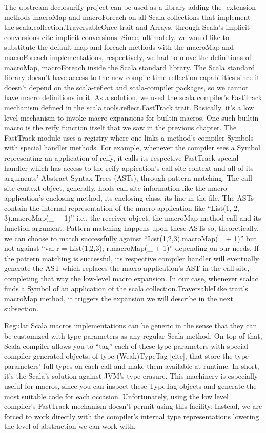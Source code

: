 The upstream declosurify project can be used as a library adding the -extension-
methods macroMap and macroForeach on all Scala collections that implement the
scala.collection.TraversableOnce trait and Arrays, through Scala's implicit
conversions {cite implicit conversions}. Since, ultimately, we would like to
substitute the default map and foreach methods with the macroMap and
macroForeach implementations, respectively, we had to move the definitions
of macroMap, macroForeach inside the Scala standard library. The Scala standard
library doesn't have access to the new compile-time reflection capabilities
since it doesn't depend on the scala-reflect and scala-compiler packages, so we
cannot have macro definitions in it. As a solution, we used the scala compiler's
FastTrack mechanism defined in the scala.tools.reflect.FastTrack trait.
Basically, it's a low level mechanism to invoke macro expansions for builtin
macros. One such builtin macro is the reify function itself that we saw in
the previous chapter. The FastTrack module uses a registry where one links a
method's compiler Symbols with special handler methods. For example, whenever
the compiler sees a Symbol representing an application of reify, it calls its
respective FastTrack special handler which has access to the reify appication's
call-site context and all of  its arguments' Abstract Syntax Trees (ASTs),
through pattern matching. The call-site context object, generally, holds
call-site information like the macro application's enclosing method, its
enclosing class, its line in the file. The ASTs contain the internal
representation of the macro application like ``List(1, 2, 3).macroMap(_ + 1)''
i.e., the receiver object, the macroMap method call and its function argument.
Pattern matching happens upon these ASTs so, theoretically, we can choose to
match successfully against ``List(1,2,3).macroMap(_ + 1)'' but not against ``val
r = List(1,2,3); r.macroMap(_ + 1)'' depending on our needs. If the pattern
matching is successful, its respective compiler handler will eventually generate
the AST which replaces the macro application's AST in the call-site, completing
that way the low-level macro expansion. In our case, whenever scalac finds a
Symbol of an application of the scala.collection.TraversableLike trait's
macroMap method, it triggers the expansion we will describe in the next
subsection.

Regular Scala macros implementations can be generic in the sense that they can
be customized with type parameters as any regular Scala method. On top of that,
Scala compiler allows you to ``tag'' each of these type parameters with special
compiler-generated objects, of type (Weak)TypeTag [cite], that store the type
parameters' full types on each call and make them available at runtime. In
short, it's the Scala's solution against JVM's type erasure. This machinery is
especially useful for macros, since you can inspect these TypeTag objects and
generate the most suitable code for each occasion. Unfortunately, using the low
level compiler's FastTrack mechanism doesn't permit using this facility.
Instead, we are forced to work directly with the compiler's internal type
representations lowering the level of abstraction we can work with.

